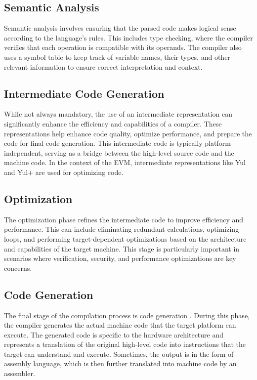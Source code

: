 \subsection{Semantic Analysis}

Semantic analysis involves ensuring that the parsed code makes logical sense according to the language's rules. This includes type checking, where the compiler verifies that each operation is compatible with its operands. The compiler also uses a symbol table to keep track of variable names, their types, and other relevant information to ensure correct interpretation and context.

\subsection{Intermediate Code Generation}

While not always mandatory, the use of an intermediate representation can significantly enhance the efficiency and capabilities of a compiler. These representations help enhance code quality, optimize performance, and prepare the code for final code generation. This intermediate code is typically platform-independent, serving as a bridge between the high-level source code and the machine code. In the context of the EVM, intermediate representations like Yul and Yul+ are used for optimizing code.

\subsection{Optimization}

The optimization phase refines the intermediate code to improve efficiency and performance. This can include eliminating redundant calculations, optimizing loops, and performing target-dependent optimizations based on the architecture and capabilities of the target machine. This stage is particularly important in scenarios where verification, security, and performance optimizations are key concerns.

\subsection{Code Generation}

The final stage of the compilation process is code generation \cite[253-281]{CompilerConstruction}. During this phase, the compiler generates the actual machine code that the target platform can execute. The generated code is specific to the hardware architecture and represents a translation of the original high-level code into instructions that the target can understand and execute. Sometimes, the output is in the form of assembly language, which is then further translated into machine code by an assembler.

